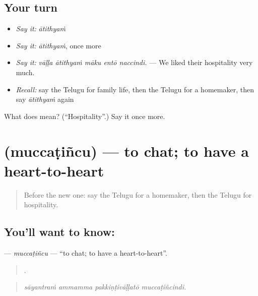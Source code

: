 \subsection*{Your turn}
\begin{itemize}
\raggedright
  \item \emph{Say it:} \emph{ātithyaṁ}
  \item \emph{Say it:} \emph{ātithyaṁ}, once more
  \item \emph{Say it:} \emph{vāḷḷa ātithyaṁ māku entō naccindi.} — We liked their hospitality very much.
  \item \emph{Recall:} say the Telugu for family life, then the Telugu for a homemaker, then say \emph{ātithyaṁ} again
\end{itemize}

\begin{tcolorbox}[breakable,colback=teal!4,colframe=teal!35!black,title={Before you move on}]
What does  mean? (\textquotedblleft{}Hospitality\textquotedblright{}.) Say it once more.
\end{tcolorbox}
\section[\texorpdfstring{\te{ముచ్చటించు} (muccaṭiñcu)}{ముచ్చటించు (muccaṭiñcu)}]{ (muccaṭiñcu) — to chat; to have a heart-to-heart}

\label{lesson:TE-C533-muccatincu}



\begin{quote}
Before the new one: say the Telugu for a homemaker, then the Telugu for hospitality.
\end{quote}

\subsection*{You'll want to know: }
\textbf{} — \emph{muccaṭiñcu} — \textquotedblleft{}to chat; to have a heart-to-heart\textquotedblright{}.

\begin{quote}
   .
\end{quote}

\begin{quote}
\emph{sāyantraṁ ammamma pakkiṇṭivāḷḷatō muccaṭiñcindi.}
\end{quote}

